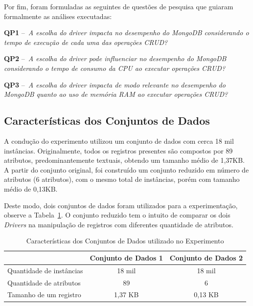 \documentclass[12pt]{article}
\begin{document}
Por fim, foram formuladas as seguintes de questões de pesquisa que guiaram formalmente as análises executadas: 

\textbf{QP1} --~\emph{A escolha do driver impacta no desempenho do MongoDB considerando o tempo de execução de cada uma das operações CRUD?}

\textbf{QP2} --~\emph{A escolha do driver pode influenciar no desempenho do MongoDB considerando o tempo de consumo da CPU ao executar operações CRUD?}

\textbf{QP3} --~\emph{A escolha do driver impacta de modo relevante no desempenho do MongoDB quanto ao uso de memória RAM ao executar operações CRUD?}

\subsection{Características dos Conjuntos de Dados}

A condução do experimento utilizou um conjunto de dados com cerca 18 mil instâncias.%
Originalmente, todos os registros presentes são compostos por 89 atributos, predominantemente textuais, obtendo um tamanho médio de 1,37KB. 
A partir do conjunto original, foi construído um conjunto reduzido em número de atributos (6 atributos), com o mesmo total de instâncias, porém com tamanho médio de 0,13KB. 

Deste modo, dois conjuntos de dados foram utilizados para a experimentação, observe a Tabela~\ref{tab:conjunto-dados}. 
O conjunto reduzido tem o intuito de comparar os dois \emph{Drivers} na manipulação de registros com diferentes quantidade de atributos.

\begin{table}[ht]
\centering
\caption{Características dos Conjuntos de Dados utilizado no Experimento}
\label{tab:conjunto-dados}
\begin{tabular}{c|c|c|}
\cline{2-3}
                         & \textbf{Conjunto de Dados 1} & \textbf{Conjunto de Dados 2} \\ \hline
\multicolumn{1}{|l|}{Quantidade de instâncias} & 18 mil   		 			& 18 mil            \\ \hline
\multicolumn{1}{|l|}{Quantidade de atributos}  & 89        		 			& 6                  \\ \hline
\multicolumn{1}{|l|}{Tamanho de um registro}   & 1,37 KB        				& 0,13 KB                    \\ \hline
\end{tabular}
\end{table}
\end{document}
